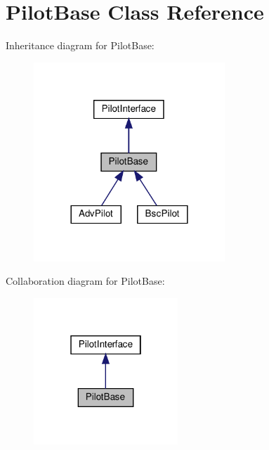 \hypertarget{classPilotBase}{}\section{Pilot\+Base Class Reference}
\label{classPilotBase}


Inheritance diagram for Pilot\+Base\+:\nopagebreak
\begin{figure}[H]
\begin{center}
\leavevmode
\includegraphics[width=204pt]{classPilotBase__inherit__graph}
\end{center}
\end{figure}


Collaboration diagram for Pilot\+Base\+:\nopagebreak
\begin{figure}[H]
\begin{center}
\leavevmode
\includegraphics[width=154pt]{classPilotBase__coll__graph}
\end{center}
\end{figure}
